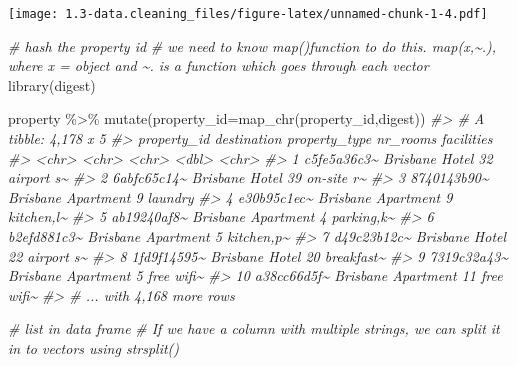 \documentclass[
]{book}
\newenvironment{Shaded}{\begin{snugshade}}{\end{snugshade}}
\newcommand{\AttributeTok}[1]{\textcolor[rgb]{0.77,0.63,0.00}{#1}}
\newcommand{\CommentTok}[1]{\textcolor[rgb]{0.56,0.35,0.01}{\textit{#1}}}
\newcommand{\FunctionTok}[1]{\textcolor[rgb]{0.00,0.00,0.00}{#1}}
\newcommand{\NormalTok}[1]{#1}
\newcommand{\SpecialCharTok}[1]{\textcolor[rgb]{0.00,0.00,0.00}{#1}}
\begin{document}
\texttt{[image: 1.3-data.cleaning\_files/figure-latex/unnamed-chunk-1-4.pdf]}

\begin{Shaded}
\begin{Highlighting}[]
    
\CommentTok{\# hash the property id}
\CommentTok{\# we need to know map()function to do this. map(x,\textasciitilde{}.), where x = object and \textasciitilde{}. is a function which goes through each vector}
\FunctionTok{library}\NormalTok{(digest)}

\NormalTok{property }\SpecialCharTok{\%\textgreater{}\%} 
  \FunctionTok{mutate}\NormalTok{(}\AttributeTok{property\_id=}\FunctionTok{map\_chr}\NormalTok{(property\_id,digest))}
\CommentTok{\#\textgreater{} \# A tibble: 4,178 x 5}
\CommentTok{\#\textgreater{}    property\_id destination property\_type nr\_rooms facilities}
\CommentTok{\#\textgreater{}    \textless{}chr\textgreater{}       \textless{}chr\textgreater{}       \textless{}chr\textgreater{}            \textless{}dbl\textgreater{} \textless{}chr\textgreater{}     }
\CommentTok{\#\textgreater{}  1 c5fe5a36c3\textasciitilde{} Brisbane    Hotel               32 airport s\textasciitilde{}}
\CommentTok{\#\textgreater{}  2 6abfc65c14\textasciitilde{} Brisbane    Hotel               39 on{-}site r\textasciitilde{}}
\CommentTok{\#\textgreater{}  3 8740143b90\textasciitilde{} Brisbane    Apartment            9 laundry   }
\CommentTok{\#\textgreater{}  4 e30b95c1ec\textasciitilde{} Brisbane    Apartment            9 kitchen,l\textasciitilde{}}
\CommentTok{\#\textgreater{}  5 ab19240af8\textasciitilde{} Brisbane    Apartment            4 parking,k\textasciitilde{}}
\CommentTok{\#\textgreater{}  6 b2efd881c3\textasciitilde{} Brisbane    Apartment            5 kitchen,p\textasciitilde{}}
\CommentTok{\#\textgreater{}  7 d49c23b12c\textasciitilde{} Brisbane    Hotel               22 airport s\textasciitilde{}}
\CommentTok{\#\textgreater{}  8 1fd9f14595\textasciitilde{} Brisbane    Hotel               20 breakfast\textasciitilde{}}
\CommentTok{\#\textgreater{}  9 7319c32a43\textasciitilde{} Brisbane    Apartment            5 free wifi\textasciitilde{}}
\CommentTok{\#\textgreater{} 10 a38cc66d5f\textasciitilde{} Brisbane    Apartment           11 free wifi\textasciitilde{}}
\CommentTok{\#\textgreater{} \# ... with 4,168 more rows}

\CommentTok{\# list in data frame}
\CommentTok{\# If we have a column with multiple strings, we can split it in to vectors using strsplit()}



\end{Highlighting}
\end{Shaded}
\end{document}
